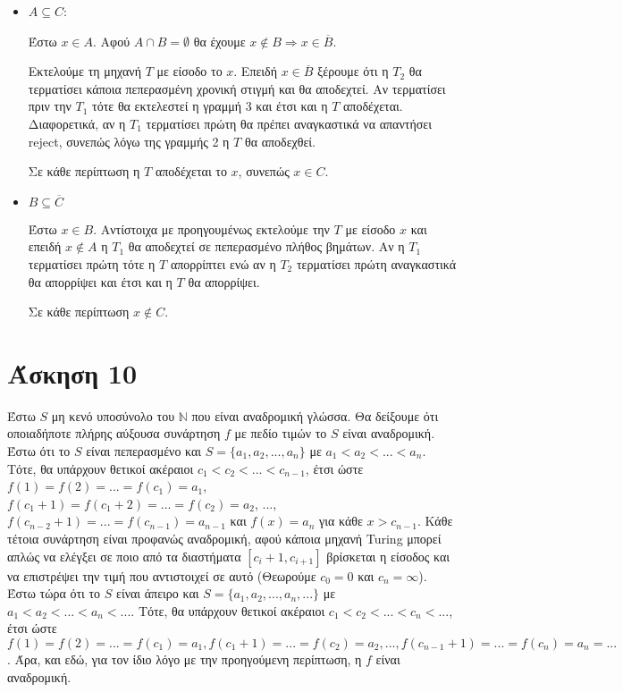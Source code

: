 \documentclass[a4paper, oneside, 11pt]{article}
\theoremstyle{definition}
\begin{document}
\begin{itemize}
\item $A \subseteq C$:
      
      Έστω $x \in A$. Αφού $A \cap B = \emptyset$ θα έχουμε $x \notin B
      \Rightarrow x \in \overline{B}$.

      Εκτελούμε τη μηχανή $T$ με είσοδο το $x$. Επειδή $x \in \overline{B}$ ξέρουμε
      ότι η $T_2$ θα τερματίσει κάποια πεπερασμένη χρονική στιγμή και θα αποδεχτεί.
      Αν τερματίσει πριν την $T_1$ τότε θα εκτελεστεί η γραμμή 3 και έτσι και η $T$
      αποδέχεται. Διαφορετικά, αν η $T_1$ τερματίσει πρώτη θα
      πρέπει αναγκαστικά να απαντήσει reject, συνεπώς λόγω της γραμμής 2 η $T$ θα
      αποδεχθεί.

      Σε κάθε περίπτωση η $T$ αποδέχεται το $x$, συνεπώς $x \in C$.

\item $B \subseteq \overline{C}$

      Έστω $x \in B$. Αντίστοιχα με προηγουμένως εκτελούμε την $T$ με είσοδο $x$ και
      επειδή $x \notin A$ η $T_1$ θα αποδεχτεί σε πεπερασμένο πλήθος βημάτων. Αν η
      $T_1$ τερματίσει πρώτη τότε η $T$ απορρίπτει ενώ αν η $T_2$ τερματίσει πρώτη
      αναγκαστικά θα απορρίψει και έτσι και η $T$ θα απορρίψει.

      Σε κάθε περίπτωση $x \notin C$.
\end{itemize}

\section*{Άσκηση 10}

Έστω $S$ μη κενό υποσύνολο του $\mathbb{N}$ που είναι αναδρομική γλώσσα. Θα δείξουμε
ότι οποιαδήποτε πλήρης αύξουσα συνάρτηση $f$ με πεδίο τιμών το $S$ είναι αναδρομική.
Έστω ότι το $S$ είναι πεπερασμένο και $S=\{a_1,a_2,...,a_n\}$ με $a_1 < a_2 < ... < a_n$.
Τότε, θα υπάρχουν θετικοί ακέραιοι $c_1 < c_2 < ... < c_{n-1}$, έτσι ώστε 
$f(1)=f(2)=...=f(c_1)=a_1$, $f(c_1+1)=f(c_1+2)=...=f(c_2)=a_2$, ..., 
$f(c_{n-2}+1)=...=f(c_{n-1})=a_{n-1}$ και $f(x)=a_n$ για κάθε $x>c_{n-1}$. Κάθε τέτοια
συνάρτηση είναι προφανώς αναδρομική, αφού κάποια μηχανή Turing μπορεί απλώς να ελέγξει
σε ποιο από τα διαστήματα $[c_i+1,c_{i+1}]$ βρίσκεται η είσοδος και να επιστρέψει
την τιμή που αντιστοιχεί σε αυτό (Θεωρούμε $c_0=0$ και $c_n=\infty$).
Έστω τώρα ότι το $S$ είναι άπειρο και $S=\{a_1,a_2,...,a_n,...\}$ με 
$a_1<a_2<...<a_n<...$. Τότε, θα υπάρχουν θετικοί ακέραιοι $c_1 < c_2 < ... < c_n < ...$,
έτσι ώστε $f(1)=f(2)=...=f(c_1)=a_1, f(c_1+1)=...=f(c_2)=a_2, ... , f(c_{n-1}+1)=...=f(c_{n})=a_n = ...$.
Άρα, και εδώ, για τον ίδιο λόγο με την προηγούμενη περίπτωση, η $f$ είναι αναδρομική.
\end{document}
